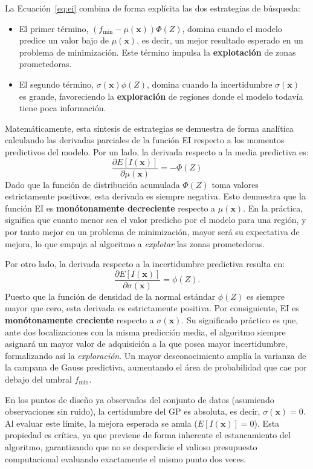 La Ecuación~\ref{eq:ei} combina de forma explícita las dos estrategias de búsqueda:

\begin{itemize}
    \item El primer término, \((f_{\min} - \mu(\bm{x})) \Phi(Z)\), domina cuando el modelo
    predice un valor bajo de \(\mu(\bm{x})\), es decir, un mejor resultado esperado en un
    problema de minimización. Este término impulsa la \textbf{explotación} de zonas
    prometedoras.

    \item El segundo término, \(\sigma(\bm{x}) \phi(Z)\), domina cuando la incertidumbre
    \(\sigma(\bm{x})\) es grande, favoreciendo la \textbf{exploración} de regiones donde el
    modelo todavía tiene poca información.
\end{itemize}

Matemáticamente, esta síntesis de estrategias se demuestra de forma analítica calculando las derivadas parciales de la función EI respecto a los momentos predictivos del modelo. 
Por un lado, la derivada respecto a la media predictiva es:
\[
\frac{\partial E[I(\bm{x})]}{\partial \mu(\bm{x})} = -\Phi(Z)
\]
Dado que la función de distribución acumulada \(\Phi(Z)\) toma valores estrictamente positivos, esta derivada es siempre negativa. Esto demuestra que la función EI es \textbf{monótonamente decreciente} respecto a \(\mu(\bm{x})\). En la práctica, significa que cuanto menor sea el valor predicho por el modelo para una región, y por tanto mejor en un problema de minimización, mayor será su expectativa de mejora, lo que empuja al algoritmo a \textit{explotar} las zonas prometedoras.

Por otro lado, la derivada respecto a la incertidumbre predictiva resulta en:
\[
\frac{\partial E[I(\bm{x})]}{\partial \sigma(\bm{x})} = \phi(Z).
\]
Puesto que la función de densidad de la normal estándar \(\phi(Z)\) es siempre mayor que cero, esta derivada es estrictamente positiva. Por consiguiente, EI es \textbf{monótonamente creciente} respecto a \(\sigma(\bm{x})\). Su significado práctico es que, ante dos localizaciones con la misma predicción media, el algoritmo siempre asignará un mayor valor de adquisición a la que posea mayor incertidumbre, formalizando así la \textit{exploración}. Un mayor desconocimiento amplía la varianza de la campana de Gauss predictiva, aumentando el área de probabilidad que cae por debajo del umbral \(f_{\min}\).

En los puntos de diseño ya observados del conjunto de datos (asumiendo observaciones sin ruido), la certidumbre del GP es absoluta, es decir, \(\sigma(\bm{x}) = 0\). Al evaluar este límite, la mejora esperada se anula (\(E[I(\bm{x})] = 0\)). Esta propiedad es crítica, ya que previene de forma inherente el estancamiento del algoritmo, garantizando que no se desperdicie el valioso presupuesto computacional evaluando exactamente el mismo punto dos veces.

